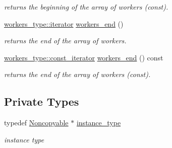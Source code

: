 \begin{DoxyCompactItemize}
\begin{DoxyCompactList}\small\item\em returns the beginning of the array of workers (const). \end{DoxyCompactList}\item 
\hypertarget{classhryky_1_1task_1_1distributor_1_1_base_a0a79720e4447f391b1cff42b229b40c7}{\hyperlink{classhryky_1_1iterator_1_1random_1_1_mutable}{workers\-\_\-type\-::iterator} \hyperlink{classhryky_1_1task_1_1distributor_1_1_base_a0a79720e4447f391b1cff42b229b40c7}{workers\-\_\-end} ()}\label{classhryky_1_1task_1_1distributor_1_1_base_a0a79720e4447f391b1cff42b229b40c7}

\begin{DoxyCompactList}\small\item\em returns the end of the array of workers. \end{DoxyCompactList}\item 
\hypertarget{classhryky_1_1task_1_1distributor_1_1_base_a3414d5dd315dda5fd80b6cb49e6bdc59}{\hyperlink{classhryky_1_1iterator_1_1random_1_1_immutable}{workers\-\_\-type\-::const\-\_\-iterator} \hyperlink{classhryky_1_1task_1_1distributor_1_1_base_a3414d5dd315dda5fd80b6cb49e6bdc59}{workers\-\_\-end} () const }\label{classhryky_1_1task_1_1distributor_1_1_base_a3414d5dd315dda5fd80b6cb49e6bdc59}

\begin{DoxyCompactList}\small\item\em returns the end of the array of workers (const). \end{DoxyCompactList}\end{DoxyCompactItemize}
\subsection*{Private Types}
\begin{DoxyCompactItemize}
\item 
\hypertarget{classhryky_1_1_noncopyable_aaf87abb55f700af85ecb0895f6178821}{typedef \hyperlink{classhryky_1_1_noncopyable}{Noncopyable} $\ast$ \hyperlink{classhryky_1_1_noncopyable_aaf87abb55f700af85ecb0895f6178821}{instance\-\_\-type}}\label{classhryky_1_1_noncopyable_aaf87abb55f700af85ecb0895f6178821}

\begin{DoxyCompactList}\small\item\em instance type \end{DoxyCompactList}\end{DoxyCompactItemize}


